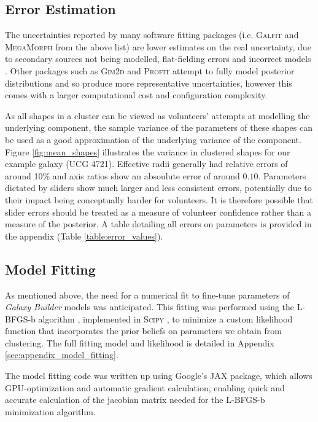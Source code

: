 \documentclass[../main.tex]{subfiles}
\begin{document}
\subsection{Error Estimation}
\label{sec:error_estimation}

The uncertainties reported by many software fitting packages (i.e. \textsc{Galfit} and \textsc{MegaMorph} from the above list) are lower estimates on the real uncertainty, due to secondary sources not being modelled, flat-fielding errors and incorrect models \citep{2010AJ....139.2097P}. Other packages such as \textsc{Gim2d} and \textsc{Profit} attempt to fully model posterior distributions and so produce more representative uncertainties, however this comes with a larger computational cost and configuration complexity.

As all shapes in a cluster can be viewed as volunteers' attempts at modelling the underlying component, the sample variance of the parameters of these shapes can be used as a good approximation of the underlying variance of the component. Figure \ref{fig:mean_shapes} illustrates the variance in clustered shapes for our example galaxy (UCG 4721). Effective radii generally had relative errors of around 10\% and axis ratios show an absoulute error of around $0.10$. Parameters dictated by sliders show much larger and less consistent errors, potentially due to their impact being conceptually harder for volunteers. It is therefore possible that slider errors should be treated as a measure of volunteer confidence rather than a measure of the posterior. A table detailing all errors on parameters is provided in the appendix (Table \ref{table:error_values}).


\subsection{Model Fitting}

As mentioned above, the need for a numerical fit to fine-tune parameters of \textit{Galaxy Builder} models was anticipated. This fitting was performed using the L-BFGS-b algorithm \citep{doi:10.1137/0916069}, implemented in \textsc{Scipy} \citep{scipy-paper}, to minimize a custom likelihood function that incorporates the prior beliefs on parameters we obtain from clustering. The full fitting model and likelihood is detailed in Appendix \ref{sec:appendix_model_fitting}.

The model fitting code was written up using Google's JAX package, which allows GPU-optimization and automatic gradient calculation, enabling quick and accurate calculation of the jacobian matrix needed for the L-BFGS-b minimization algorithm.
\end{document}
